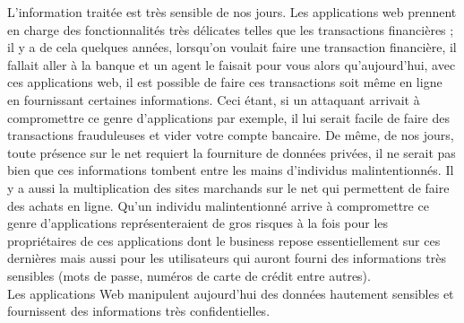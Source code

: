 L’information traitée est très sensible de nos jours. Les applications web prennent en charge des fonctionnalités très délicates telles que les transactions financières ; il y a de cela quelques années, lorsqu’on voulait faire une transaction financière, il fallait aller à la banque et un agent le faisait pour vous alors qu’aujourd’hui, avec ces applications web, il est possible de faire ces transactions soit même en ligne en fournissant certaines informations. Ceci étant, si un attaquant arrivait à compromettre ce genre d’applications par exemple, il lui serait facile de faire des transactions frauduleuses et vider votre compte bancaire. De même, de nos jours, toute présence sur le net requiert la fourniture de données privées, il ne serait pas bien que ces informations tombent entre les mains d’individus malintentionnés. Il y a aussi la multiplication des sites marchands sur le net qui permettent de faire des achats en ligne. Qu’un individu malintentionné arrive à compromettre ce genre d’applications représenteraient de gros risques à la fois pour les propriétaires de ces applications dont le business repose essentiellement sur ces dernières mais aussi pour les utilisateurs qui auront fourni des informations très sensibles (mots de passe, numéros de carte de crédit entre autres). \\
Les applications Web manipulent aujourd'hui des données hautement sensibles et fournissent 
des informations très confidentielles. 

